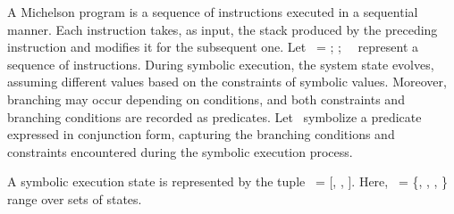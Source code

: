 \documentclass[a4paper,UKenglish,cleveref, autoref, thm-restate]{lipics-v2021}
\begin{document}
A Michelson program is a sequence of instructions executed in a sequential manner. Each instruction takes, as input, the stack produced by the preceding instruction and modifies it for the subsequent one. Let \INSTRUCTION\ = \InstructionOne; \InstructionTwo; \DOT\  \InstructionN\ represent a sequence of instructions.
During symbolic execution,  the system state evolves, assuming different values based on the constraints of symbolic values. Moreover, branching may occur depending on conditions, and both constraints and branching conditions are recorded as predicates. Let \PREDICATE\ symbolize a predicate expressed in conjunction form, capturing the branching conditions and constraints encountered during the symbolic execution process.
\begin{definition}
A symbolic execution state is represented by the tuple \STATE\ = [\INSTRUCTION, \STACK, \PREDICATE]. Here, \SYSTEM\ = \{\STATEONE, \STATETWO, \DOT, \STATEN \} range over sets of  states.
\end{definition}
\end{document}

